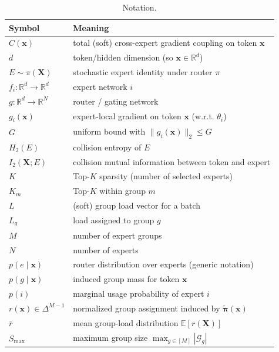 \documentclass[sigconf,nonacm]{acmart}
\begin{document}
\begin{table}[!htbp]
\caption{Notation.}\label{tab:notation}
\centering
\small
\setlength{\tabcolsep}{6pt}
\renewcommand{\arraystretch}{1.15}
\begin{tabular}{p{}p{}}
\toprule
\textbf{Symbol} & \textbf{Meaning}\\
\midrule
$C(\mathbf{x})$ & total (soft) cross-expert gradient coupling on token $\mathbf{x}$ \\
$d$ & token/hidden dimension (so $\mathbf{x}\in\mathbb{R}^d$) \\
$E\sim\pi(\mathbf{X})$ & stochastic expert identity under router $\pi$ \\
$f_i:\mathbb{R}^d\to\mathbb{R}^d$ & expert network $i$ \\
$g:\mathbb{R}^d\to\mathbb{R}^N$ & router / gating network \\
$g_i(\mathbf{x})$ & expert-local gradient on token $\mathbf{x}$ (w.r.t. $\theta_i$) \\
$G$ & uniform bound with $\|g_i(\mathbf{x})\|_2\le G$ \\
$H_2(E)$ & collision entropy of $E$ \\
$I_2(\mathbf{X};E)$ & collision mutual information between token and expert \\
$K$ & Top-$K$ sparsity (number of selected experts) \\
$K_m$ & Top-$K$ within group $m$ \\
$L$ & (soft) group load vector for a batch \\
$L_g$ & load assigned to group $g$ \\
$M$ & number of expert groups \\
$N$ & number of experts \\
$p(e\mid\mathbf{x})$ & router distribution over experts (generic notation) \\
$p(g\mid\mathbf{x})$ & induced group mass for token $\mathbf{x}$ \\
$p(i)$ & marginal usage probability of expert $i$ \\
$r(\mathbf{x})\in\Delta^{M-1}$ & normalized group assignment induced by $\widetilde{\bm{\pi}}(\mathbf{x})$ \\
$\bar r$ & mean group-load distribution $\mathbb{E}[r(\mathbf{X})]$ \\
$S_{\max}$ & maximum group size $\max_{g\in[M]}|\mathcal{G}_g|$ \\

\end{tabular}
\end{table}
\end{document}

